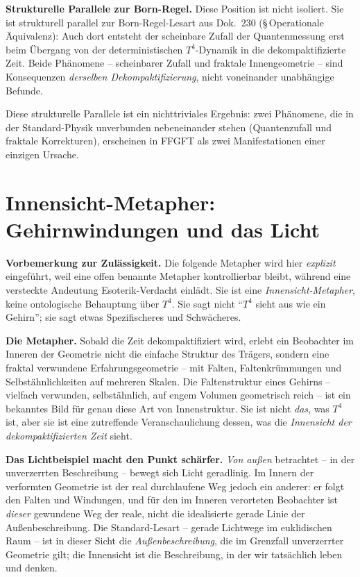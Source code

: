 \textbf{Strukturelle Parallele zur Born-Regel.} Diese Position ist
nicht isoliert. Sie ist strukturell parallel zur Born-Regel-Lesart
aus Dok.~230 (§\,Operationale Äquivalenz): Auch dort entsteht der
scheinbare Zufall der Quantenmessung erst beim Übergang von der
deterministischen $T^4$-Dynamik in die dekompaktifizierte Zeit. Beide
Phänomene -- scheinbarer Zufall und fraktale Innengeometrie -- sind
Konsequenzen \emph{derselben Dekompaktifizierung}, nicht voneinander
unabhängige Befunde.

Diese strukturelle Parallele ist ein nichttriviales Ergebnis: zwei
Phänomene, die in der Standard-Physik unverbunden nebeneinander
stehen (Quantenzufall und fraktale Korrekturen), erscheinen in
FFGFT als zwei Manifestationen einer einzigen Ursache.

\section{Innensicht-Metapher: Gehirnwindungen und das Licht}

\textbf{Vorbemerkung zur Zulässigkeit.} Die folgende Metapher wird hier
\emph{explizit} eingeführt, weil eine offen benannte Metapher
kontrollierbar bleibt, während eine versteckte Andeutung Esoterik-Verdacht
einlädt. Sie ist eine \emph{Innensicht-Metapher}, keine ontologische
Behauptung über $T^4$. Sie sagt nicht \enquote{$T^4$ sieht aus wie ein
Gehirn}; sie sagt etwas Spezifischeres und Schwächeres.

\textbf{Die Metapher.} Sobald die Zeit dekompaktifiziert wird, erlebt ein
Beobachter im Inneren der Geometrie nicht die einfache Struktur des
Trägers, sondern eine fraktal verwundene Erfahrungsgeometrie -- mit
Falten, Faltenkrümmungen und Selbstähnlichkeiten auf mehreren Skalen.
Die Faltenstruktur eines Gehirns -- vielfach verwunden, selbstähnlich,
auf engem Volumen geometrisch reich -- ist ein bekanntes Bild für genau
diese Art von Innenstruktur. Sie ist nicht \emph{das}, was $T^4$ ist,
aber sie ist eine zutreffende Veranschaulichung dessen, was die
\emph{Innensicht der dekompaktifizierten Zeit} sieht.

\textbf{Das Lichtbeispiel macht den Punkt schärfer.} \emph{Von außen}
betrachtet -- in der unverzerrten Beschreibung -- bewegt sich Licht
geradlinig. Im Innern der verformten Geometrie ist der real
durchlaufene Weg jedoch ein anderer: er folgt den Falten und
Windungen, und für den im Inneren verorteten Beobachter ist
\emph{dieser} gewundene Weg der reale, nicht die idealisierte
gerade Linie der Außenbeschreibung. Die Standard-Lesart -- gerade
Lichtwege im euklidischen Raum -- ist in dieser Sicht die
\emph{Außenbeschreibung}, die im Grenzfall unverzerrter Geometrie
gilt; die Innensicht ist die Beschreibung, in der wir tatsächlich
leben und denken.

